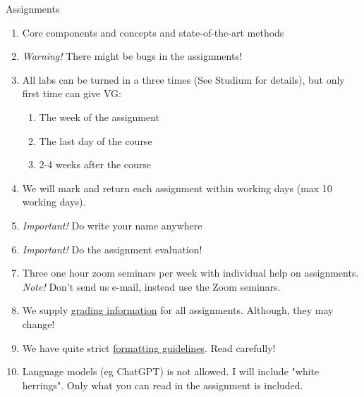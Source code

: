 \documentclass[10pt]{beamer}
\begin{document}
\begin{frame}{Assignments}

\begin{enumerate}
\item Core components and concepts and state-of-the-art methods\pause
\item \emph{Warning!} There might be bugs in the assignments!\pause
\item All labs can be turned in a three times (See Studium for details), but only first time can give VG:
\begin{enumerate}
\item The week of the assignment
\item The last day of the course
\item 2-4 weeks after the course
\end{enumerate}
\pause
\item We will mark and return each assignment within  working days (max 10 working days).\pause
\item \emph{Important!} Do  write your name anywhere\pause
\item \emph{Important!} Do the assignment evaluation!\pause
\item Three one hour zoom seminars per week with individual help on assignments. \emph{Note!} Don't send us e-mail, instead use the Zoom seminars. \pause
\item We supply \href{https://github.com/MansMeg/BSDA/tree/main/grading}{grading information} for all assignments. Although, they may change! \pause
\item We have quite strict \href{https://github.com/MansMeg/BSDA/blob/main/templates/assignment_template.pdf}{formatting guidelines}. Read carefully!
\item Language models (eg ChatGPT) is not allowed. I will include "white herrings". Only what you can read in the assignment is included.
\end{enumerate}
\end{frame}
\end{document}
